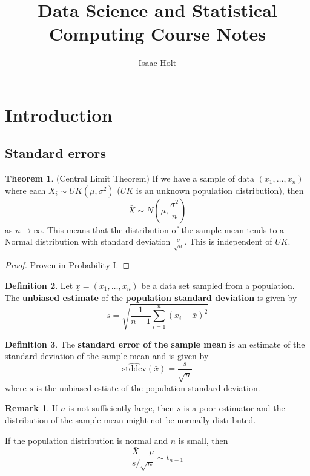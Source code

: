 \documentclass[12pt,a4paper]{article}
\title{Data Science and Statistical Computing Course Notes}
\author{Isaac Holt}
\theoremstyle{definition}
\newtheorem{definition}{Definition}[subsection]
\newtheorem{theorem}[definition]{Theorem}
\newtheorem*{remark}{Remark}
\begin{document}
\maketitle

\section{Introduction}

\subsection{Standard errors}

\begin{theorem}
	(Central Limit Theorem) If we have a sample of data $(x_1, \dots, x_n)$ where each $X_i \sim UK(\mu, \sigma^2)$ ($UK$ is an unknown population distribution), then
	\[
		\bar{X} \sim N\left(\mu, \frac{\sigma^2}{n}\right)
	\]
	as $n \rightarrow \infty$. This means that the distribution of the sample mean tends to a Normal distribution with standard deviation $\frac{\sigma}{\sqrt{n}}$. This is independent of $UK$.
\end{theorem}

\begin{proof}
	Proven in Probability I.
\end{proof}

\begin{definition}
	Let $\underline{x} = (x_1, \dots, x_n)$ be a data set sampled from a population. The \textbf{unbiased estimate} of the \textbf{population standard deviation} is given by
	\[
		s = \sqrt{\frac{1}{n - 1} \sum_{i = 1}^n {\left(x_i - \bar{x}\right)}^2}
	\]
\end{definition}

\begin{definition}
	The \textbf{standard error of the sample mean} is an estimate of the standard deviation of the sample mean and is given by
	\[
		\widehat{\text{stddev}}(\bar{x}) = \frac{s}{\sqrt{n}}
	\]
	where $s$ is the unbiased estiate of the population standard deviation.
\end{definition}

\begin{remark}
	If $n$ is not sufficiently large, then $s$ is a poor estimator and the distribution of the sample mean might not be normally distributed.

	If the population distribution is normal and $n$ is small, then
	\[
		\frac{\bar{X} - \mu}{s / \sqrt{n}} \sim t_{n - 1}
	\]
\end{remark}
\end{document}

